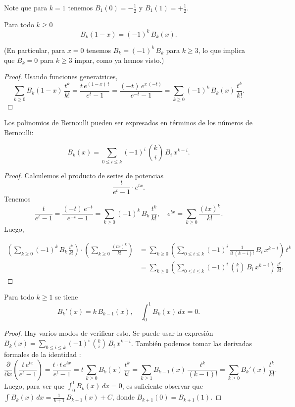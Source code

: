 \documentclass{article}
\begin{document}
Note que para $k = 1$ tenemos $B_1 (0) = -\frac{1}{2}$ y $B_1 (1) = +\frac{1}{2}$.

\begin{observacion*}
Para todo $k \ge 0$
$$B_k (1-x) = (-1)^k\,B_k (x).$$
\end{observacion*}

\noindent (En particular, para $x = 0$ tenemos $B_k = (-1)^k\,B_k$ para $k \ge 3$, lo que implica que $B_k = 0$ para $k \ge 3$ impar, como ya hemos visto.)

\begin{proof}
Usando funciones generatrices,
$$\sum_{k\ge 0} B_k (1-x)\,\frac{t^k}{k!} = \frac{t\,e^{(1-x)\,t}}{e^t - 1} = \frac{(-t)\,e^{x\,(-t)}}{e^{-t} - 1} = \sum_{k\ge 0} (-1)^k\,B_k (x)\,\frac{t^k}{k!}.$$
\end{proof}

Los polinomios de Bernoulli pueden ser expresados en términos de los números de Bernoulli:

\begin{proposicion*}
$$B_k (x) = \sum_{0 \le i \le k} (-1)^i \, {k \choose i}\,B_i\,x^{k-i}.$$

\begin{proof}
Calculemos el producto de series de potencias
$$\frac{t}{e^t-1}\cdot e^{tx}.$$
Tenemos
$$\frac{t}{e^t-1} = \frac{(-t)\,e^{-t}}{e^{-t} - 1} = \sum_{k \ge 0} (-1)^k \, B_k \, \frac{t^k}{k!}, \quad e^{tx} = \sum_{k \ge 0} \frac{(tx)^k}{k!}.$$
Luego,

\begin{align*}
\left(\sum_{k \ge 0} (-1)^k \, B_k \, \frac{t^k}{k!}\right) \cdot \left(\sum_{k \ge 0} \frac{(tx)^k}{k!}\right) & = \sum_{k \ge 0} \left(\sum_{0 \le i \le k} (-1)^i \, \frac{1}{i! \, (k-i)!} \, B_i\,x^{k-i}\right)\,t^k \\
 & = \sum_{k \ge 0} \left(\sum_{0 \le i \le k} (-1)^i \, {k \choose i} \, B_i\,x^{k-i}\right)\,\frac{t^k}{k!}.
\end{align*}
\end{proof}
\end{proposicion*}

\begin{proposicion*}
Para todo $k \ge 1$ se tiene
$$B_k' (x) = k\,B_{k-1} (x), \quad \int_0^1 B_k (x)\,dx = 0.$$

\begin{proof}
Hay varios modos de verificar esto. Se puede usar la expresión $B_k (x) = \sum_{0 \le i \le k} (-1)^i \, {k \choose i}\,B_i\,x^{k-i}$. También podemos tomar las derivadas formales de la identidad :
$$\frac{\partial}{\partial x} \left(\frac{t\,e^{tx}}{e^t - 1}\right) = \frac{t\cdot t\,e^{tx}}{e^t - 1} = t\,\sum_{k \ge 0} B_k (x) \, \frac{t^k}{k!} = \sum_{k \ge 1} B_{k-1} (x) \, \frac{t^k}{(k-1)!} = \sum_{k \ge 0} B_k' (x) \, \frac{t^k}{k!}.$$
Luego, para ver que $\int_0^1 B_k (x)\,dx = 0$, es suficiente observar que $\int B_k (x)\,dx = \frac{1}{k+1}\,B_{k+1} (x) + C$, donde $B_{k+1} (0) = B_{k+1} (1)$.
\end{proof}
\end{proposicion*}
\end{document}
